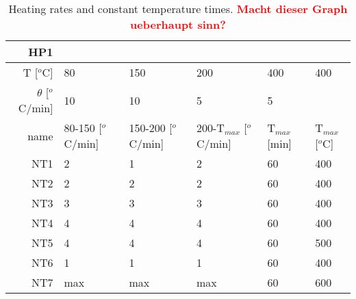 \documentclass[a4paper]{article}
\newcommand{\td}[1]{\textbf{\textcolor{red}{#1}}}
\newcommand{\oc}{$^o$C}
\begin{document}
\begin{table}[h]
	\centering
	\begin{tabular}{rl ll ll}%
		HP1		&&&&&\\%
		\hline
		T [\oc]				&80		&150	&200	&400	&400 	\\
		$\theta$ [\oc/min]	&10 	&10		&5 		&5		& 		\\
		\hline
		name	&80-150 [\oc/min]	&150-200 [\oc/min]	&200-T$_{max}$ [\oc/min]	&T$_{max}$ [min]	&T$_{max}$ [\oc] \\
		NT1		&2					&1					&2					&60 &400 \\
		NT2		&2					&2					&2					&60 &400 \\
		NT3		&3					&3					&3					&60 &400 \\
		NT4		&4					&4					&4					&60 &400 \\
		NT5		&4					&4					&4					&60 &500 \\
		NT6		&1					&1					&1					&60 &400 \\
		NT7		&max				&max				&max				&60 &600 \\
		\hline
	\end{tabular}
	\caption{Heating rates and constant temperature times. \td{Macht dieser Graph ueberhaupt sinn? }}
	\label{tab:nt}
\end{table}
\end{document}
